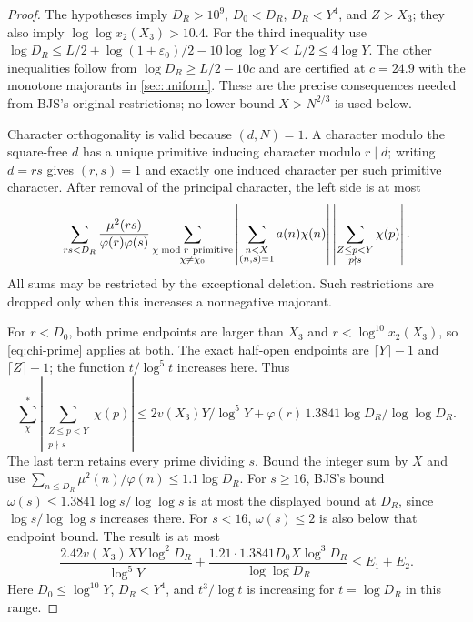 \documentclass[11pt]{article}
\theoremstyle{definition}
\newcommand{\eps}{\varepsilon}
\begin{document}
\begin{proof}
The hypotheses imply $D_R>10^9$, $D_0<D_R$, $D_R<Y^4$, and
$Z>X_3$; they also imply $\log\log x_2(X_3)>10.4$.
For the third inequality use
$\log D_R\le L/2+\log(1+\eps_0)/2-10\log\log Y<L/2\le4\log Y$.
The other inequalities follow from
$\log D_R\ge L/2-10c$ and are certified at $c=24.9$ with the monotone
majorants in \cref{sec:uniform}.  These are the precise consequences
needed from BJS's original restrictions; no lower bound $X>N^{2/3}$
is used below.

Character orthogonality is valid because $(d,N)=1$.  A character modulo
the square-free $d$ has a unique primitive inducing character modulo
$r\mid d$; writing $d=rs$ gives $(r,s)=1$ and exactly one induced
character per such primitive character.  After removal of the principal
character, the left side is at most
\begin{equation}\label{eq:rectangle-primitive}
 \sum_{rs<D_R}\frac{\mu^2(rs)}{\varphi(r)\varphi(s)}
 \sum_{\substack{\chi\bmod r\ {\rm primitive}\\\chi\ne\chi_0}}
 \left|\sum_{\substack{n<X\\(n,s)=1}}a(n)\chi(n)\right|
 \left|\sum_{\substack{Z\le p<Y\\p\nmid s}}\chi(p)\right|.
\end{equation}
All sums may be restricted by the exceptional deletion.  Such restrictions
are dropped only when this increases a nonnegative majorant.

For $r<D_0$, both prime endpoints are larger than $X_3$ and
$r<\log^{10}x_2(X_3)$, so \eqref{eq:chi-prime} applies at both.
The exact half-open endpoints are $\lceil Y\rceil-1$ and
$\lceil Z\rceil-1$; the function $t/\log^5t$ increases here.  Thus
\[
 \sum_\chi^*\left|\sum_{\substack{Z\le p<Y\\p\nmid s}}\chi(p)\right|
 \le 2v(X_3)Y/\log^5Y+
       \varphi(r)\,1.3841\log D_R/\log\log D_R.
\]
The last term retains every prime dividing $s$.  Bound the integer sum by
$X$ and use $\sum_{n\le D_R}\mu^2(n)/\varphi(n)\le1.1\log D_R$.
For $s\ge16$, BJS's bound
$\omega(s)\le1.3841\log s/\log\log s$ is at most the displayed
bound at $D_R$, since $\log s/\log\log s$ increases there.
For $s<16$, $\omega(s)\le2$ is also below that endpoint bound.
The result is at most
\[
 \frac{2.42v(X_3)XY\log^2D_R}{\log^5Y}
 +\frac{1.21\cdot1.3841D_0X\log^3D_R}{\log\log D_R}
 \le E_1+E_2.
\]
Here $D_0\le\log^{10}Y$, $D_R<Y^4$, and
$t^3/\log t$ is increasing for $t=\log D_R$ in this range.


\end{proof}
\end{document}
